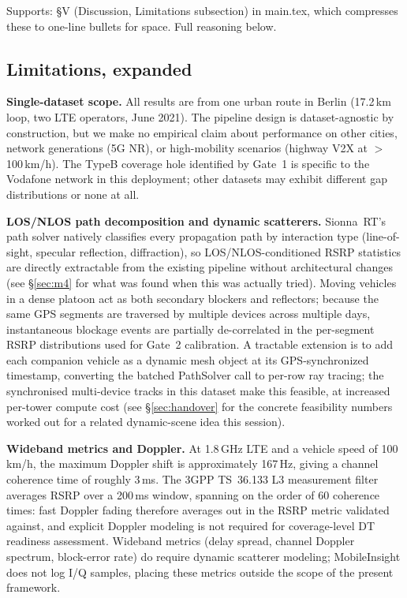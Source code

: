 \documentclass[11pt]{article}
\begin{document}
Supports: \S V (Discussion, Limitations subsection) in main.tex, which
compresses these to one-line bullets for space. Full reasoning below.

\subsection{Limitations, expanded}

\textbf{Single-dataset scope.} All results are from one urban route in
Berlin (17.2\,km loop, two LTE operators, June 2021). The pipeline
design is dataset-agnostic by construction, but we make no empirical
claim about performance on other cities, network generations (5G NR),
or high-mobility scenarios (highway V2X at $>$100\,km/h). The TypeB
coverage hole identified by Gate~1 is specific to the Vodafone network
in this deployment; other datasets may exhibit different gap
distributions or none at all.

\textbf{LOS/NLOS path decomposition and dynamic scatterers.} Sionna~RT's
path solver natively classifies every propagation path by interaction
type (line-of-sight, specular reflection, diffraction), so
LOS/NLOS-conditioned RSRP statistics are directly extractable from the
existing pipeline without architectural changes (see \S\ref{sec:m4} for
what was found when this was actually tried). Moving vehicles in a
dense platoon act as both secondary blockers and reflectors; because the
same GPS segments are traversed by multiple devices across multiple
days, instantaneous blockage events are partially de-correlated in the
per-segment RSRP distributions used for Gate~2 calibration. A tractable
extension is to add each companion vehicle as a dynamic mesh object at
its GPS-synchronized timestamp, converting the batched PathSolver call
to per-row ray tracing; the synchronised multi-device tracks in this
dataset make this feasible, at increased per-tower compute cost (see
\S\ref{sec:handover} for the concrete feasibility numbers worked out
for a related dynamic-scene idea this session).

\textbf{Wideband metrics and Doppler.} At 1.8\,GHz LTE and a vehicle
speed of 100\,km/h, the maximum Doppler shift is approximately 167\,Hz,
giving a channel coherence time of roughly 3\,ms. The 3GPP TS~36.133 L3
measurement filter averages RSRP over a 200\,ms window, spanning on the
order of 60 coherence times: fast Doppler fading therefore averages out
in the RSRP metric validated against, and explicit Doppler modeling is
not required for coverage-level DT readiness assessment. Wideband
metrics (delay spread, channel Doppler spectrum, block-error rate) do
require dynamic scatterer modeling; MobileInsight does not log I/Q
samples, placing these metrics outside the scope of the present
framework.
\end{document}
